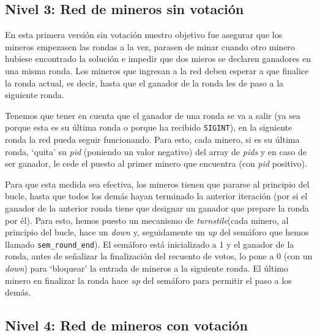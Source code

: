 \documentclass{article}
\begin{document}
\subsection*{Nivel 3: Red de mineros sin votación}

En esta primera versión sin votación nuestro objetivo fue asegurar que los mineros empezasen las rondas a la vez, parasen de minar cuando otro minero hubiese encontrado la solución e impedir que dos mieros se declaren ganadores en una misma ronda. Los mineros que ingresan a la red deben esperar a que finalice la ronda actual, es decir, hasta que el ganador de la ronda les de paso a la siguiente ronda.

Tenemos que tener en cuenta que el ganador de una ronda se va a salir (ya sea porque esta es su última ronda o porque ha recibido \texttt{SIGINT}), en la siguiente ronda la red pueda seguir funcionando. Para esto, cada minero, si es su última ronda, `quita' su \textit{pid} (poniendo un valor negativo) del array de \textit{pids} y en caso de ser ganador, le cede el puesto al primer minero que encuentra (con \emph{pid} positivo).

Para que esta medida sea efectiva, los mineros tienen que pararse al principio del bucle, hasta que todos los demás hayan terminado la anterior iteración (por si el ganador de la anterior ronda tiene que designar un ganador que prepare la ronda por él). Para esto, hemos puesto un mecanismo de \textit{turnstile}\footnotemark (cada minero, al principio del bucle, hace un \textit{down} y, seguidamente un \textit{up} del semáforo que hemos llamado \texttt{sem\_round\_end}). El semáforo está inicializado a 1 y el ganador de la ronda, antes de señalizar la finalización del recuento de votos, lo pone a 0 (con un \textit{down}) para `bloquear' la entrada
de mineros a la siguiente ronda. El último minero en finalizar la ronda hace \textit{up} del semáforo para permitir el paso a los demás.


\subsection*{Nivel 4: Red de mineros con votación}
\end{document}
